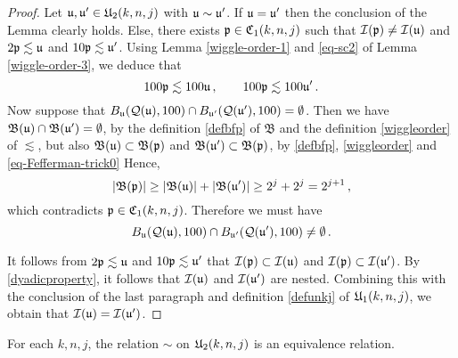 {\begin{proof}
    Let ${\mathfrak u}, {\mathfrak u}' \in {\mathfrak U}_2(k,n,j)$ with ${\mathfrak u} \sim {\mathfrak u}'$. If ${\mathfrak u} = {\mathfrak u}'$ then the conclusion of the Lemma clearly holds. Else, there exists ${\mathfrak p} \in {\mathfrak C}_1(k,n,j)$ such that ${\mathcal{I}}({\mathfrak p}) \ne {\mathcal{I}}({\mathfrak u})$ and  $2 {\mathfrak p} \lesssim {\mathfrak u}$ and $10 {\mathfrak p} \lesssim {\mathfrak u}'$.
    Using Lemma \ref{wiggle-order-1} and \eqref{eq-sc2} of Lemma \ref{wiggle-order-3}, we deduce that
    \begin{equation}
        \label{eq-Fefferman-trick0}
        100 {\mathfrak p}\lesssim  100 {\mathfrak u}\,, \qquad 100 {\mathfrak p} \lesssim 100{\mathfrak u}'\,.
    \end{equation}
    Now suppose that $B_{{\mathfrak u}}({\mathcal{Q}}({\mathfrak u}), 100) \cap B_{{\mathfrak u}'}({\mathcal{Q}}({\mathfrak u}'), 100) = \emptyset$. Then we have $\mathfrak{B}({\mathfrak u}) \cap \mathfrak{B}({\mathfrak u}') = \emptyset$, by the definition \eqref{defbfp} of $\mathfrak{B}$ and the definition \eqref{wiggleorder} of $\lesssim$, but also $\mathfrak{B}({\mathfrak u}) \subset \mathfrak{B}({\mathfrak p})$ and $\mathfrak{B}({\mathfrak u}') \subset \mathfrak{B}({\mathfrak p})$, by \eqref{defbfp}, \eqref{wiggleorder} and \eqref{eq-Fefferman-trick0}
    Hence,
    $$
        |\mathfrak{B}({\mathfrak p})| \geq |\mathfrak{B}({\mathfrak u})| + |\mathfrak{B}({\mathfrak u}')| \geq 2^{j} + 2^j = 2^{j+1}\,,
    $$
    which contradicts ${\mathfrak p} \in {\mathfrak C}_1(k,n,j)$. Therefore we must have
    \begin{equation*}
        B_{{\mathfrak u}}({\mathcal{Q}}({\mathfrak u}), 100) \cap B_{{\mathfrak u}'}({\mathcal{Q}}({\mathfrak u}'), 100) \ne \emptyset\, .
    \end{equation*}

    It follows from $2{\mathfrak p} \lesssim {\mathfrak u}$ and $10{\mathfrak p} \lesssim {\mathfrak u}'$ that ${\mathcal{I}}({\mathfrak p}) \subset {\mathcal{I}}({\mathfrak u})$ and ${\mathcal{I}}({\mathfrak p}) \subset {\mathcal{I}}({\mathfrak u}')$. By \eqref{dyadicproperty}, it follows that ${\mathcal{I}}({\mathfrak u})$ and ${\mathcal{I}}({\mathfrak u}')$ are nested.
    Combining this with the conclusion of the last paragraph and definition \eqref{defunkj} of ${\mathfrak U}_1(k,n,j)$, we obtain that ${\mathcal{I}}({\mathfrak u}) = {\mathcal{I}}({\mathfrak u}')$.
\end{proof}


\begin{lemma}
\label{equivalence-relation}
For each $k,n,j$, the relation $\sim$ on
${\mathfrak U}_2(k,n,j)$ is an equivalence relation.
\end{lemma}

}
